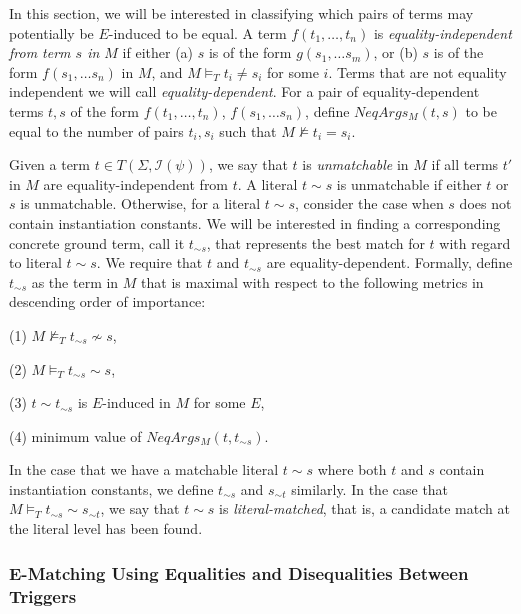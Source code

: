 \documentclass{llncs}
\begin{document}
In this section, we will be interested in classifying which pairs of terms may potentially be $E$-induced to be equal.
A term $f( t_1, \ldots, t_n )$ is \emph{equality-independent from term $s$ in $M$} if either (a) $s$ is of the form $g( s_1, \ldots s_m )$, or (b) $s$ is of the form $f( s_1, \ldots s_n )$ in $M$, and $M \models_T t_i \neq s_i$ for some $i$.
Terms that are not equality independent we will call \emph{equality-dependent}.
For a pair of equality-dependent terms $t,s$ of the form $f( t_1, \ldots, t_n )$, $f( s_1, \ldots s_n )$, define $NeqArgs_M( t, s )$ to be equal to the number of pairs $t_i, s_i$ such that $M \not\models t_i = s_i$.

Given a term $t \in T( \Sigma, \mathcal{I}( \psi ) )$, we say that $t$ is \emph{unmatchable} in $M$ if all terms $t'$ in $M$ are equality-independent from $t$.
A literal $t \sim s$ is unmatchable if either $t$ or $s$ is unmatchable.
Otherwise, for a literal $t \sim s$, consider the case when $s$ does not contain instantiation constants.
We will be interested in finding a corresponding concrete ground term, call it $t_{\sim s}$, that represents the best match for $t$ with regard to literal $t \sim s$.
We require that $t$ and $t_{\sim s}$ are equality-dependent.
Formally, define $t_{\sim s}$ as the term in $M$ that is maximal with respect to the following metrics in descending order of importance: 

(1) $M \not\models_T t_{\sim s} \not\sim s$, 

(2) $M \models_T t_{\sim s} \sim s$,

(3) $t \sim t_{\sim s}$ is $E$-induced in $M$ for some $E$,

(4) minimum value of $NeqArgs_M( t, t_{\sim s} )$.

In the case that we have a matchable literal $t \sim s$ where both $t$ and $s$ contain instantiation constants, we define $t_{\sim s}$ and $s_{\sim t}$ similarly.
In the case that $M \models_T t_{\sim s} \sim s_{\sim t}$, we say that $t \sim s$ is \emph{literal-matched}, that is, a candidate match at the literal level has been found.

\subsubsection{E-Matching Using Equalities and Disequalities Between Triggers}
\end{document}
